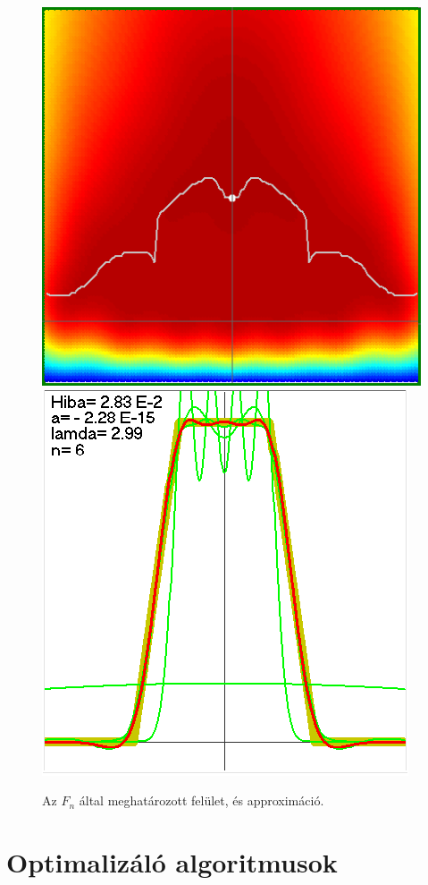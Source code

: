 \documentclass[oneside,titlepage,12pt,a4paper]{report}
\begin{document}
\begin{figure}[htb!]
  \centering
\includegraphics[scale=0.225]{./Abrak/Ereszkedo/er36_a.PNG}
\hspace{10mm}
\includegraphics[scale=0.225]{./Abrak/Ereszkedo/er36_b.PNG}
\caption{Az $F_n$ \'altal meghat\'arozott fel\"ulet, \'es approxim\'aci\'o.}
\label{fig:hibafuggveny2}
\end{figure}

\chapter{ Optimaliz\'al\'o  algoritmusok}
\end{document}
